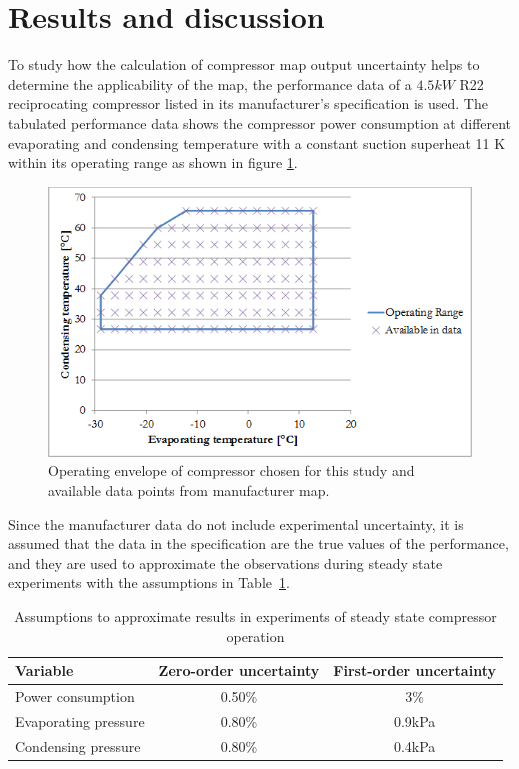\section{Results and discussion}
\label{sec:results_discussion}
To study how the calculation of compressor map output uncertainty helps to determine the applicability of the map, the performance data of a $4.5 kW$ R22 reciprocating compressor listed in its manufacturer’s specification is used. The tabulated performance data shows the compressor power consumption at different evaporating and condensing temperature with a constant suction superheat 11 K within its operating range as shown in figure \ref{fig:oper_envelope}.

\begin{figure}[h]
\includegraphics[width=0.7\linewidth]{./fig/operating_envelope.png}\hspace{0.05\linewidth}%
\begin{minipage}[b]{0.25\linewidth}\caption{\label{fig:oper_envelope}Operating envelope of compressor chosen for this study and available data points from manufacturer map.}
\end{minipage}
\end{figure}

Since the manufacturer data do not include experimental uncertainty, it is assumed that the data in the specification are the true values of the performance, and they are used to approximate the observations during steady state experiments with the assumptions in Table~\ref{tab:study_assumptions}.

\begin{table}[htbp]
  \centering
  \caption{Assumptions to approximate results in experiments of steady state compressor operation}
    \begin{tabular}{lcc}
    \toprule
    \textbf{Variable} & \textbf{Zero-order uncertainty} & \textbf{First-order uncertainty} \\
    \midrule
    Power consumption & 0.50\% & 3\% \\
    Evaporating pressure & 0.80\% & 0.9kPa \\
    Condensing pressure & 0.80\% & 0.4kPa \\
    \bottomrule
    \end{tabular}%
  \label{tab:study_assumptions}%
\end{table}%

